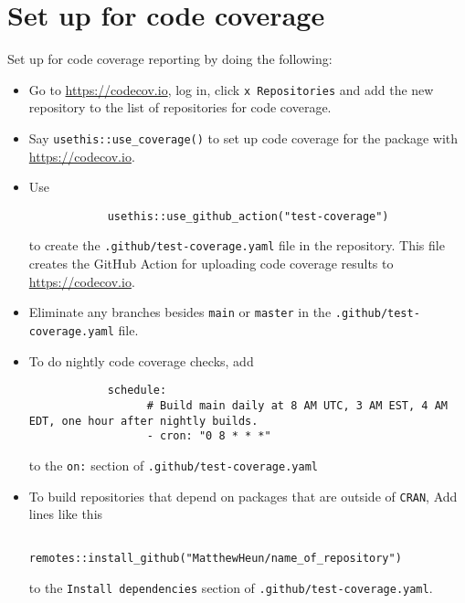 \documentclass{article}
\begin{document}
\section{Set up for code coverage}
\label{sec:codecov_setup}

Set up for code coverage reporting by doing the following:
%
\begin{itemize}

  \item Go to \url{https://codecov.io}, log in, click \verb|x Repositories| and add
  		the new repository to the list of repositories for code coverage.

  \item Say \verb|usethis::use_coverage()| to set up code coverage
		for the package with \url{https://codecov.io}.

  \item Use
  		\begin{verbatim}
			usethis::use_github_action("test-coverage")
		\end{verbatim}
		to create the \verb|.github/test-coverage.yaml| file in the repository.
		This file creates the GitHub Action for
		uploading code coverage results to \url{https://codecov.io}.

  \item Eliminate any branches besides \texttt{main} or \texttt{master}
  		in the \verb|.github/test-coverage.yaml| file.

  \item To do nightly code coverage checks, add
  		\begin{verbatim}
			schedule:
				  # Build main daily at 8 AM UTC, 3 AM EST, 4 AM EDT, one hour after nightly builds.
				  - cron: "0 8 * * *"
  		\end{verbatim}
		to the \texttt{on:} section of \verb|.github/test-coverage.yaml|

  \item To build repositories that depend on packages that are outside of \texttt{CRAN},
		Add lines like this
	        \begin{verbatim}
				remotes::install_github("MatthewHeun/name_of_repository")
			\end{verbatim}
		to the \texttt{Install dependencies} section of
		\texttt{.github/test-coverage.yaml}.

\end{itemize}
\end{document}
